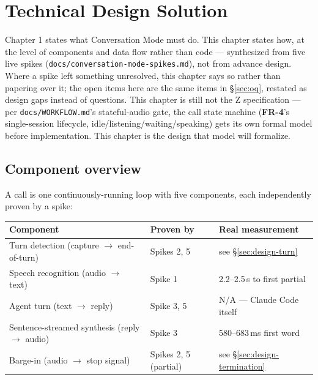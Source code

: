\documentclass[a4paper,11pt]{report}
\newcommand{\fr}[1]{\textbf{FR-#1}}
\begin{document}
\chapter{Technical Design Solution}

Chapter 1 states what Conversation Mode must do. This chapter states how,
at the level of components and data flow rather than code --- synthesized
from five live spikes (\texttt{docs/conversation-mode-spikes.md}), not
from advance design. Where a spike left something unresolved, this
chapter says so rather than papering over it; the open items here are the
same items in \S\ref{sec:oq}, restated as design gaps instead of
questions. This chapter is still not the Z specification --- per
\texttt{docs/WORKFLOW.md}'s stateful-audio gate, the call state machine
(\fr{4}'s single-session lifecycle, idle/listening/waiting/speaking) gets
its own formal model before implementation. This chapter is the design
that model will formalize.

\section{Component overview}

A call is one continuously-running loop with five components, each
independently proven by a spike:

\begin{center}
\begin{tabular}{@{}lll@{}}
\toprule
Component & Proven by & Real measurement \\
\midrule
Turn detection (capture $\to$ end-of-turn) & Spikes 2, 5 & see \S\ref{sec:design-turn} \\
Speech recognition (audio $\to$ text) & Spike 1 & 2.2--2.5\,s to first partial \\
Agent turn (text $\to$ reply) & Spike 3, 5 & N/A --- Claude Code itself \\
Sentence-streamed synthesis (reply $\to$ audio) & Spike 3 & 580--683\,ms first word \\
Barge-in (audio $\to$ stop signal) & Spikes 2, 5 (partial) & see \S\ref{sec:design-termination} \\
\bottomrule
\end{tabular}
\end{center}
\end{document}
